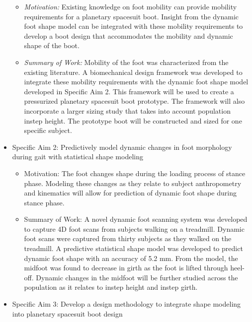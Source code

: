 \documentclass[defaultstyle,11pt]{comps}
\providecommand{\tightlist}{%
  \setlength{\itemsep}{0pt}\setlength{\parskip}{0pt}}
\begin{document}
\begin{itemize}
  \begin{itemize}
  \tightlist
  \item
    \emph{Motivation:} Existing knowledge on foot mobility can provide mobility requirements for a planetary spacesuit boot. Insight from the dynamic foot shape model can be integrated with these mobility requirements to develop a boot design that accommodates the mobility and dynamic shape of the boot.
  \item
    \emph{Summary of Work:} Mobility of the foot was characterized from the existing literature. A biomechanical design framework was developed to integrate these mobility requirements with the dynamic foot shape model developed in Specific Aim 2. This framework will be used to create a pressurized planetary spacesuit boot prototype. The framework will also incorporate a larger sizing study that takes into account population instep height. The prototype boot will be constructed and sized for one specific subject.
  \end{itemize}
\item
  Specific Aim 2: Predictively model dynamic changes in foot morphology during gait with statistical shape modeling

  \begin{itemize}
  \tightlist
  \item
    Motivation: The foot changes shape during the loading process of stance phase. Modeling these changes as they relate to subject anthropometry and kinematics will allow for prediction of dynamic foot shape during stance phase.
  \item
    Summary of Work: A novel dynamic foot scanning system was developed to capture 4D foot scans from subjects walking on a treadmill. Dynamic foot scans were captured from thirty subjects as they walked on the treadmill. A predictive statistical shape model was developed to predict dynamic foot shape with an accuracy of 5.2 mm. From the model, the midfoot was found to decrease in girth as the foot is lifted through heel-off. Dynamic changes in the midfoot will be further studied across the population as it relates to instep height and instep girth.
  \end{itemize}
\item
  Specific Aim 3: Develop a design methodology to integrate shape modeling into planetary spacesuit boot design


\end{itemize}
\end{document}
